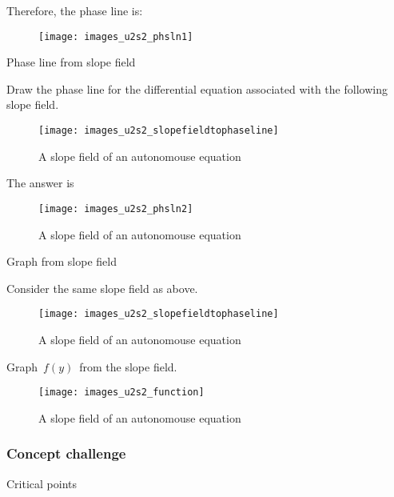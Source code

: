 Therefore, the phase line is:

\begin{figure}[ht!]
  \centering
  \texttt{[image: images\_u2s2\_phsln1]}
\end{figure}
  
\clearpage

\begin{exercise}
  Phase line from slope field
\end{exercise}

Draw the phase line for the differential equation associated with the following slope field.

\begin{figure}[ht!]
  \centering
  \texttt{[image: images\_u2s2\_slopefieldtophaseline]}
  \caption{A slope field of an autonomouse equation}
\end{figure}

The answer is

\begin{figure}[ht!]
  \centering
  \texttt{[image: images\_u2s2\_phsln2]}
  \caption{A slope field of an autonomouse equation}
\end{figure}

\clearpage

\begin{exercise}
  Graph from slope field
\end{exercise}

Consider the same slope field as above.

\begin{figure}[ht!]
  \centering
  \texttt{[image: images\_u2s2\_slopefieldtophaseline]}
  \caption{A slope field of an autonomouse equation}
\end{figure}

Graph $\, f(y) \,$ from the slope field.

\begin{figure}[ht!]
  \centering
  \texttt{[image: images\_u2s2\_function]}
  \caption{A slope field of an autonomouse equation}
\end{figure}

\clearpage

\subsubsection{Concept challenge}

\begin{exercise}
  Critical points
\end{exercise}

